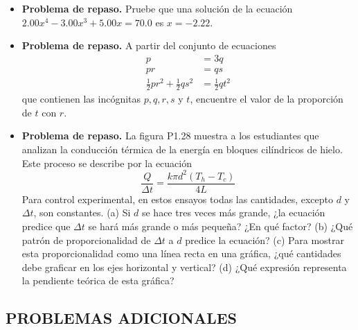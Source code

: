\documentclass[11pt,a4paper]{article}
\begin{document}
\begin{itemize}
    \item[\textbf{26.}] \textbf{Problema de repaso.} Pruebe que una solución de la ecuación $2.00x^4 - 3.00x^3 + 5.00x = 70.0$ es $x = -2.22$.
    \vspace*{5cm}
    
    \item[\textbf{27.}] \textbf{Problema de repaso.} A partir del conjunto de ecuaciones
    \begin{align*}
        p &= 3q \\
        pr &= qs \\
        \frac{1}{2}pr^2 + \frac{1}{2}qs^2 &= \frac{1}{2}qt^2
    \end{align*}
    que contienen las incógnitas $p, q, r, s$ y $t$, encuentre el valor de la proporción de $t$ con $r$.
    \vspace*{6cm}
    
    \item[\textbf{28.}] \textbf{Problema de repaso.} La figura P1.28 muestra a los estudiantes que analizan la conducción térmica de la energía en bloques cilíndricos de hielo. Este proceso se describe por la ecuación
    $$ \frac{Q}{\Delta t} = \frac{k \pi d^2 (T_h - T_c)}{4L} $$
    Para control experimental, en estos ensayos todas las cantidades, excepto $d$ y $\Delta t$, son constantes. (a) Si $d$ se hace tres veces más grande, ¿la ecuación predice que $\Delta t$ se hará más grande o más pequeña? ¿En qué factor? (b) ¿Qué patrón de proporcionalidad de $\Delta t$ a $d$ predice la ecuación? (c) Para mostrar esta proporcionalidad como una línea recta en una gráfica, ¿qué cantidades debe graficar en los ejes horizontal y vertical? (d) ¿Qué expresión representa la pendiente teórica de esta gráfica?
    \vspace*{10cm}
\end{itemize}

\newpage

\subsection*{PROBLEMAS ADICIONALES}
\end{document}
